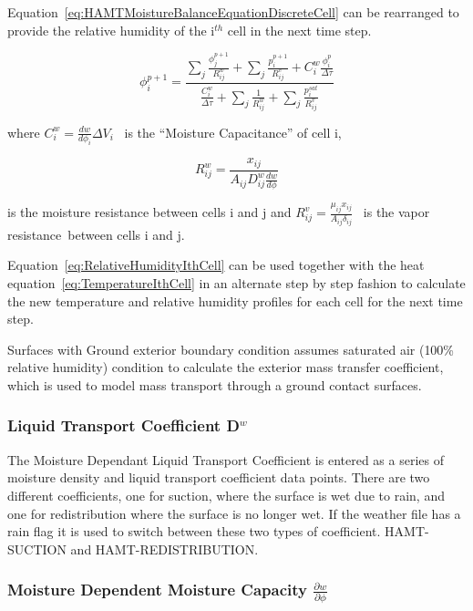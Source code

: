 Equation~\ref{eq:HAMTMoistureBalanceEquationDiscreteCell} can be rearranged to provide the relative humidity of the i\(^{th}\) cell in the next time step.

\begin{equation}
\phi_i^{p + 1} = \frac{{\sum\nolimits_j {\frac{{\phi_j^{p + 1}}}{{R_{ij}^w}}}  + \sum\nolimits_j {\frac{{p_i^{p + 1}}}{{R_{ij}^v}}}  + C_i^w\frac{{\phi_i^p}}{{\Delta \tau }}}}{{\frac{{C_i^w}}{{\Delta \tau }} + \sum\nolimits_j {\frac{1}{{R_{ij}^w}} + \sum\nolimits_j {\frac{{p_i^{sat}}}{{R_{ij}^v}}} } }}
\label{eq:RelativeHumidityIthCell}
\end{equation}

where \(C_i^w = \frac{dw}{d\phi_{i}}\Delta {V_i}\) ~is the ``Moisture Capacitance'' of cell i,

\begin{equation}
R_{ij}^w = \frac{{{x_{ij}}}}{{{A_{ij}}D_{ij}^w\frac{{dw}}{{d\phi }}}}
\end{equation}

is the moisture resistance between cells i and j and \(R_{ij}^v = \frac{\mu_{ij}x_{ij}}{A_{ij}\delta_{ij}}\) ~is the vapor resistance~between cells i and j.

Equation~\ref{eq:RelativeHumidityIthCell} can be used together with the heat equation~\ref{eq:TemperatureIthCell} in an alternate step by step fashion to calculate the new temperature and relative humidity profiles for each cell for the next time step.

Surfaces with Ground exterior boundary condition assumes saturated air ({100\%} relative humidity) condition to calculate the exterior mass transfer coefficient, which is used to model mass transport through a ground contact surfaces. 

\subsubsection{Liquid Transport Coefficient D\(^{w}\)}\label{liquid-transport-coefficient-dw}

The Moisture Dependant Liquid Transport Coefficient is entered as a series of moisture density and liquid transport coefficient data points. There are two different coefficients, one for suction, where the surface is wet due to rain, and one for redistribution where the surface is no longer wet. If the weather file has a rain flag it is used to switch between these two types of coefficient. HAMT-SUCTION and HAMT-REDISTRIBUTION.

\subsubsection{Moisture Dependent Moisture Capacity \(\frac{\partial w}{\partial \phi}\)}\label{moisture-dependent-moisture-capacity-fracpartial-wpartial-phi}

